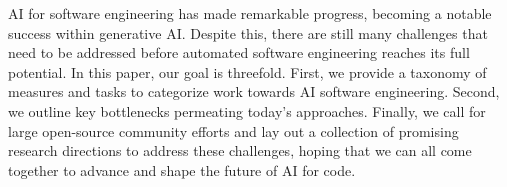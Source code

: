 AI for software engineering has made remarkable progress, becoming a notable success within generative AI. Despite this, there are still many challenges that need to be addressed before automated software engineering reaches its full potential. In this paper, our goal is threefold. First, we provide a taxonomy of measures and tasks to categorize work towards AI software engineering. Second, we outline key bottlenecks permeating today's approaches. Finally, we call for large open-source community efforts and lay out a collection of promising research directions to address these challenges, hoping that we can all come together to advance and shape the future of AI for code.
